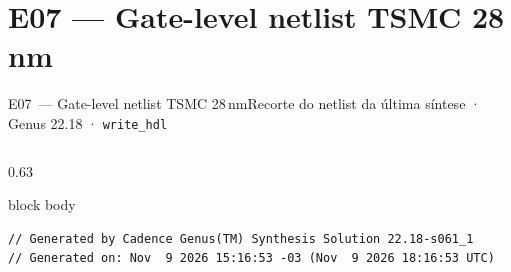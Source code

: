 \documentclass[aspectratio=169,10pt,t]{beamer}
\begin{document}
\section{E07 — Gate-level netlist TSMC 28\,nm}
\begin{frame}[fragile]{E07~— Gate-level netlist TSMC 28\,nm}{Recorte do netlist da última síntese · Genus 22.18 · \texttt{write\_hdl}}
  \vspace*{-0.3cm}
  \begin{columns}[T]
    \begin{column}{0.63\textwidth}
      \tiny
      \begin{beamercolorbox}[rounded=true,shadow=false,sep=3pt]{block body}
\vspace*{-0.6\baselineskip}
\begin{verbatim}
// Generated by Cadence Genus(TM) Synthesis Solution 22.18-s061_1
// Generated on: Nov  9 2026 15:16:53 -03 (Nov  9 2026 18:16:53 UTC)


\end{verbatim}
\end{beamercolorbox}
\end{column}
\end{columns}
\end{frame}
\end{document}

